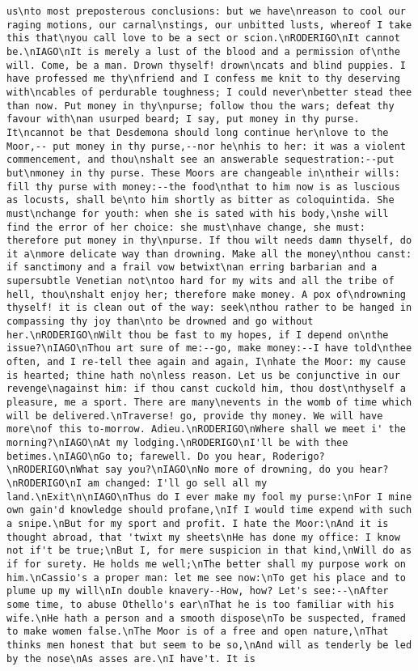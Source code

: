 \begin{verbatim}
us\nto most preposterous conclusions: but we have\nreason to cool our raging motions, our carnal\nstings, our unbitted lusts, whereof I take this that\nyou call love to be a sect or scion.\nRODERIGO\nIt cannot be.\nIAGO\nIt is merely a lust of the blood and a permission of\nthe will. Come, be a man. Drown thyself! drown\ncats and blind puppies. I have professed me thy\nfriend and I confess me knit to thy deserving with\ncables of perdurable toughness; I could never\nbetter stead thee than now. Put money in thy\npurse; follow thou the wars; defeat thy favour with\nan usurped beard; I say, put money in thy purse. It\ncannot be that Desdemona should long continue her\nlove to the Moor,-- put money in thy purse,--nor he\nhis to her: it was a violent commencement, and thou\nshalt see an answerable sequestration:--put but\nmoney in thy purse. These Moors are changeable in\ntheir wills: fill thy purse with money:--the food\nthat to him now is as luscious as locusts, shall be\nto him shortly as bitter as coloquintida. She must\nchange for youth: when she is sated with his body,\nshe will find the error of her choice: she must\nhave change, she must: therefore put money in thy\npurse. If thou wilt needs damn thyself, do it a\nmore delicate way than drowning. Make all the money\nthou canst: if sanctimony and a frail vow betwixt\nan erring barbarian and a supersubtle Venetian not\ntoo hard for my wits and all the tribe of hell, thou\nshalt enjoy her; therefore make money. A pox of\ndrowning thyself! it is clean out of the way: seek\nthou rather to be hanged in compassing thy joy than\nto be drowned and go without her.\nRODERIGO\nWilt thou be fast to my hopes, if I depend on\nthe issue?\nIAGO\nThou art sure of me:--go, make money:--I have told\nthee often, and I re-tell thee again and again, I\nhate the Moor: my cause is hearted; thine hath no\nless reason. Let us be conjunctive in our revenge\nagainst him: if thou canst cuckold him, thou dost\nthyself a pleasure, me a sport. There are many\nevents in the womb of time which will be delivered.\nTraverse! go, provide thy money. We will have more\nof this to-morrow. Adieu.\nRODERIGO\nWhere shall we meet i' the morning?\nIAGO\nAt my lodging.\nRODERIGO\nI'll be with thee betimes.\nIAGO\nGo to; farewell. Do you hear, Roderigo?\nRODERIGO\nWhat say you?\nIAGO\nNo more of drowning, do you hear?\nRODERIGO\nI am changed: I'll go sell all my land.\nExit\n\nIAGO\nThus do I ever make my fool my purse:\nFor I mine own gain'd knowledge should profane,\nIf I would time expend with such a snipe.\nBut for my sport and profit. I hate the Moor:\nAnd it is thought abroad, that 'twixt my sheets\nHe has done my office: I know not if't be true;\nBut I, for mere suspicion in that kind,\nWill do as if for surety. He holds me well;\nThe better shall my purpose work on him.\nCassio's a proper man: let me see now:\nTo get his place and to plume up my will\nIn double knavery--How, how? Let's see:--\nAfter some time, to abuse Othello's ear\nThat he is too familiar with his wife.\nHe hath a person and a smooth dispose\nTo be suspected, framed to make women false.\nThe Moor is of a free and open nature,\nThat thinks men honest that but seem to be so,\nAnd will as tenderly be led by the nose\nAs asses are.\nI have't. It is 
\end{verbatim}
